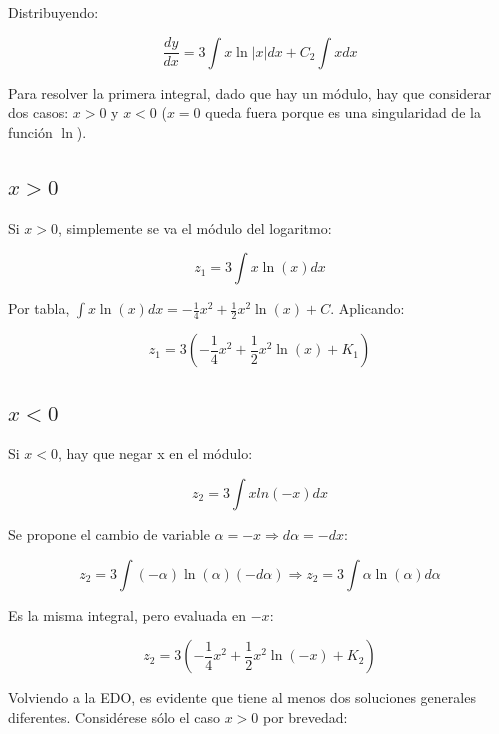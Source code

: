 \documentclass{article}
\begin{document}
Distribuyendo:

\begin{equation}
\frac{dy}{dx} = 3 \int x \ln |x| dx + C_2 \int x dx
\end{equation}

Para resolver la primera integral, dado que hay un módulo, hay que considerar dos casos: $x>0$ y $x <0$ ($x=0$ queda fuera porque es una singularidad de la función $\ln$).

\subsection{$x > 0$}

Si $x > 0$, simplemente se va el módulo del logaritmo:

\begin{equation}
z_1 = 3 \int x \ln(x) dx
\end{equation}

Por tabla, $\int x \ln(x) dx = -\frac{1}{4} x^2 + \frac{1}{2} x^2 \ln(x) + C$. Aplicando:

\begin{equation}
z_1 = 3  \left( -\frac{1}{4} x^2 + \frac{1}{2} x^2 \ln (x) + K_1 \right)
\end{equation}

\subsection{$x < 0$}

Si $x < 0$, hay que negar x en el módulo:

\begin{equation}
z_2 = 3 \int x ln(-x) dx 
\end{equation}

Se propone el cambio de variable $\alpha = -x \Rightarrow d\alpha = -dx$:

\begin{equation}
z_2 = 3 \int (-\alpha) \ln(\alpha) (-d\alpha) \Rightarrow z_2 = 3 \int \alpha \ln(\alpha) d\alpha
\end{equation}

Es la misma integral, pero evaluada en $-x$:

\begin{equation}
z_2 = 3 \left( -\frac{1}{4} x^2 + \frac{1}{2} x^2 \ln(-x) + K_2 \right)
\end{equation}

Volviendo a la EDO, es evidente que tiene al menos dos soluciones generales diferentes. Considérese sólo el caso $x>0$ por brevedad:
\end{document}
